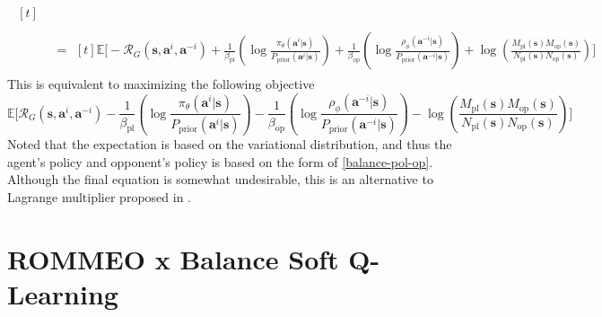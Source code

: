 \begin{equation}
\begin{aligned}
\begin{aligned}[t]
        \end{aligned} \\
        &=\begin{aligned}[t]
            \mathbb{E}\Bigg[ - \mathcal{R}_{G}(\boldsymbol{s}, \boldsymbol{a}^i, \boldsymbol{a}^{-i}) + \frac{1}{\beta_{\text{pl}}}\left(\log \frac{\pi_{\theta}(\boldsymbol{a}^i |\boldsymbol{s})}{P_{\text{prior}}(\boldsymbol{a}^i | \boldsymbol{s})}\right) + \frac{1}{\beta_{\text{op}}} \left(\log \frac{\rho_{\phi}(\boldsymbol{a}^{-i} |\boldsymbol{s})}{P_{\text{prior}}(\boldsymbol{a}^{-i} |\boldsymbol{s})}\right) + \log\left(\frac{M_{\text{pl}}(\boldsymbol{s})M_{\text{op}}(\boldsymbol{s})}{N_{\text{pl}}(\boldsymbol{s})N_{\text{op}}(\boldsymbol{s})}\right) \Bigg]
        \end{aligned}
    \end{aligned}
\end{equation}
This is equivalent to maximizing the following objective
\begin{equation}
    \mathbb{E}\Bigg[ \mathcal{R}_{G}(\boldsymbol{s}, \boldsymbol{a}^i, \boldsymbol{a}^{-i}) - \frac{1}{\beta_{\text{pl}}}\left(\log \frac{\pi_{\theta}(\boldsymbol{a}^i |\boldsymbol{s})}{P_{\text{prior}}(\boldsymbol{a}^i | \boldsymbol{s})}\right) - \frac{1}{\beta_{\text{op}}} \left(\log \frac{\rho_{\phi}(\boldsymbol{a}^{-i} |\boldsymbol{s})}{P_{\text{prior}}(\boldsymbol{a}^{-i} |\boldsymbol{s})}\right) - \log\left(\frac{M_{\text{pl}}(\boldsymbol{s})M_{\text{op}}(\boldsymbol{s})}{N_{\text{pl}}(\boldsymbol{s})N_{\text{op}}(\boldsymbol{s})}\right) \Bigg]
\end{equation}
Noted that the expectation is based on the variational distribution, and thus the agent's policy and opponent's policy is based on the form of \ref{balance-pol-op}. Although the final equation is somewhat undesirable, this is an alternative to  Lagrange multiplier proposed in \cite{grau2018balancing}.


\section{ROMMEO \cite{tian2019regularized} x Balance Soft Q-Learning \cite{grau2018balancing}}


